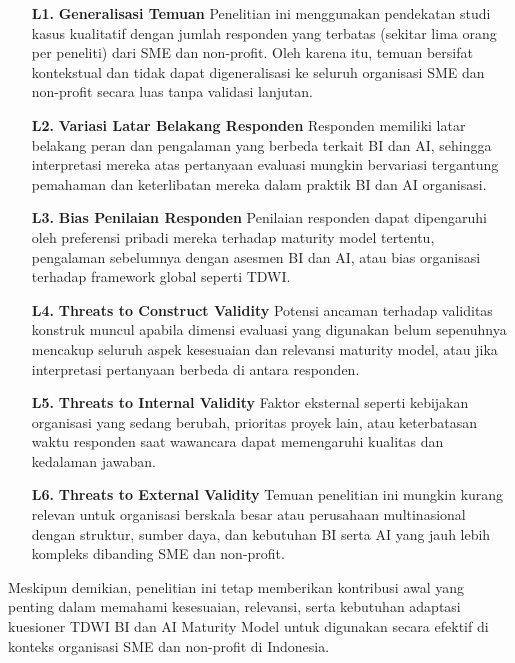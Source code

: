 \documentclass{article}
\begin{document}
\begin{enumerate}
	\item[\textbf{L1.}] \textbf{Generalisasi Temuan}  
	Penelitian ini menggunakan pendekatan studi kasus kualitatif dengan jumlah responden yang terbatas (sekitar lima orang per peneliti) dari SME dan non-profit. Oleh karena itu, temuan bersifat kontekstual dan tidak dapat digeneralisasi ke seluruh organisasi SME dan non-profit secara luas tanpa validasi lanjutan.
	
	\item[\textbf{L2.}] \textbf{Variasi Latar Belakang Responden}  
	Responden memiliki latar belakang peran dan pengalaman yang berbeda terkait BI dan AI, sehingga interpretasi mereka atas pertanyaan evaluasi mungkin bervariasi tergantung pemahaman dan keterlibatan mereka dalam praktik BI dan AI organisasi.
	
	\item[\textbf{L3.}] \textbf{Bias Penilaian Responden}  
	Penilaian responden dapat dipengaruhi oleh preferensi pribadi mereka terhadap maturity model tertentu, pengalaman sebelumnya dengan asesmen BI dan AI, atau bias organisasi terhadap framework global seperti TDWI.
	
	\item[\textbf{L4.}] \textbf{Threats to Construct Validity}  
	Potensi ancaman terhadap validitas konstruk muncul apabila dimensi evaluasi yang digunakan belum sepenuhnya mencakup seluruh aspek kesesuaian dan relevansi maturity model, atau jika interpretasi pertanyaan berbeda di antara responden.
	
	\item[\textbf{L5.}] \textbf{Threats to Internal Validity}  
	Faktor eksternal seperti kebijakan organisasi yang sedang berubah, prioritas proyek lain, atau keterbatasan waktu responden saat wawancara dapat memengaruhi kualitas dan kedalaman jawaban.
	
	\item[\textbf{L6.}] \textbf{Threats to External Validity}  
	Temuan penelitian ini mungkin kurang relevan untuk organisasi berskala besar atau perusahaan multinasional dengan struktur, sumber daya, dan kebutuhan BI serta AI yang jauh lebih kompleks dibanding SME dan non-profit.
	
\end{enumerate}

Meskipun demikian, penelitian ini tetap memberikan kontribusi awal yang penting dalam memahami kesesuaian, relevansi, serta kebutuhan adaptasi kuesioner TDWI BI dan AI Maturity Model untuk digunakan secara efektif di konteks organisasi SME dan non-profit di Indonesia.
\end{document}
